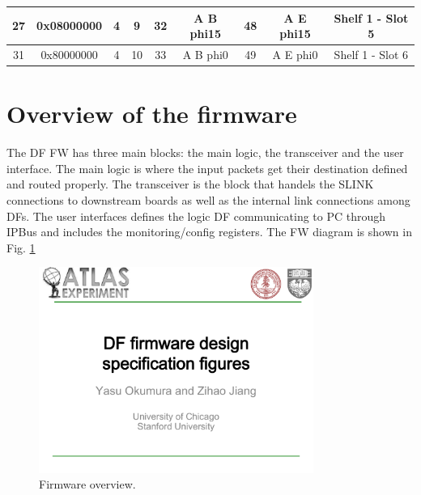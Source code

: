 \documentclass[11pt,letterpaper]{article}
\begin{document}
\begin{table}[]
\begin{tabular}{|c|c|c|c|c|c|c|c|c|}
27                     & 0x08000000            & 4                          & 9                         & 32                            & A B phi15                     & 48                            & A E phi15                     & Shelf 1 - Slot 5             \\ \hline
31                     & 0x80000000            & 4                          & 10                        & 33                            & A B phi0                      & 49                            & A E phi0                      & Shelf 1 - Slot 6             \\ \hline
\end{tabular}
\end{table}

\clearpage



\section{Overview of the firmware}

    The DF FW has three main blocks: the main logic, the transceiver and the user interface. The main logic is where the input packets get their destination defined and routed properly. The transceiver is the block that handels the SLINK connections to downstream boards as well as the internal link connections among DFs. The user interfaces defines the logic DF communicating to PC through IPBus and includes the monitoring/config registers. The FW diagram is shown in Fig. \ref{fig:OVERVIEW}


\begin{figure}[h!]
  \centering
  \includegraphics[width=0.80\textwidth,clip,page=3]{figures.pdf}
  \caption{Firmware overview.}
  \label{fig:OVERVIEW}
\end{figure}
\end{document}
